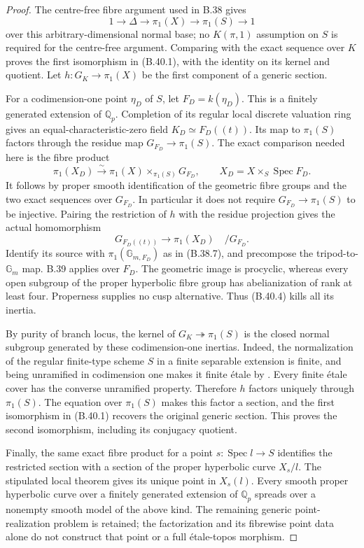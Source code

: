 \begin{proof}
The centre-free fibre argument used in B.38 gives
\[
 1\longrightarrow\Delta\longrightarrow\pi_1(X)
       \longrightarrow\pi_1(S)\longrightarrow1
 \tag{B.40.2}
\]
over this arbitrary-dimensional normal base; no
$K(\pi,1)$ assumption on $S$ is required for the
centre-free argument. Comparing with the exact
sequence over $K$ proves the first isomorphism in
(B.40.1), with the identity on its kernel and quotient.
Let $h:G_K\to\pi_1(X)$ be the first component of
a generic section.

For a codimension-one point $\eta_D$ of $S$, let
$F_D=k(\eta_D)$. This is a finitely generated
extension of $\mathbb Q_p$. Completion of its
regular local discrete valuation ring gives an
equal-characteristic-zero field
$K_D\simeq F_D((t))$. Its map to $\pi_1(S)$
factors through the residue map $G_{F_D}\to\pi_1(S)$.
The exact comparison needed here is the fibre
product
\[
 \pi_1(X_D)\xrightarrow{\sim}
       \pi_1(X)\times_{\pi_1(S)}G_{F_D},
 \qquad X_D=X\times_S\operatorname{Spec}F_D.
 \tag{B.40.3}
\]
It follows by proper smooth identification of the
geometric fibre groups and the two exact sequences
over $G_{F_D}$. In particular it does not require
$G_{F_D}\to\pi_1(S)$ to be injective.
Pairing the restriction of $h$ with the residue
projection gives the actual homomorphism
\[
 G_{F_D((t))}\longrightarrow\pi_1(X_D)
                                      \quad/G_{F_D}.
 \tag{B.40.4}
\]
Identify its source with $\pi_1(\mathbb G_{m,F_D})$
as in (B.38.7), and precompose the tripod-to-$\mathbb G_m$
map. B.39 applies over $F_D$. The geometric image
is procyclic, whereas every open subgroup of the
proper hyperbolic fibre group has abelianization
of rank at least four. Properness supplies no cusp
alternative. Thus (B.40.4) kills all its inertia.

By purity of branch locus, the kernel of
$G_K\twoheadrightarrow\pi_1(S)$ is the closed
normal subgroup generated by these codimension-one
inertias. Indeed, the normalization of the regular
finite-type scheme $S$ in a finite separable
extension is finite, and being unramified in
codimension one makes it finite \'etale by
\cite[Lemma 58.21.4 and Example 58.13.3]{B_StacksPurity}.
Every finite \'etale cover has the converse
unramified property. Therefore $h$ factors uniquely
through $\pi_1(S)$. The equation over $\pi_1(S)$
makes this factor a section, and the first
isomorphism in (B.40.1) recovers the original
generic section. This proves the second isomorphism,
including its conjugacy quotient.

Finally, the same exact fibre product for a point
$s:\operatorname{Spec}l\to S$ identifies the
restricted section with a section of the proper
hyperbolic curve $X_s/l$. The stipulated local
theorem gives its unique point in $X_s(l)$.
Every smooth proper hyperbolic curve over a
finitely generated extension of $\mathbb Q_p$
spreads over a nonempty smooth model of the above
kind. The remaining generic point-realization
problem is retained; the factorization and its
fibrewise point data alone do not construct that
point or a full \'etale-topos morphism.
\end{proof}

